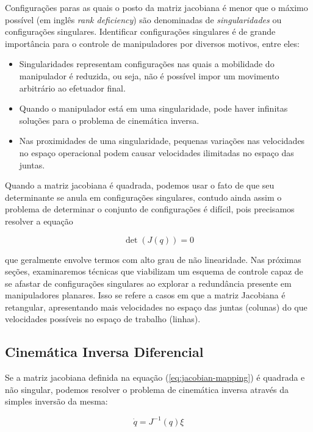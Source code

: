 Configurações paras as quais o posto da matriz jacobiana é menor que o máximo
possível (em inglês \emph{rank deficiency}) são denominadas de
\emph{singularidades} ou configurações singulares. Identificar configurações
singulares é de grande importância para o controle de manipuladores por
diversos motivos, entre eles:

\begin{itemize}
    \item Singularidades representam configurações nas quais a mobilidade do manipulador
          é reduzida, ou seja, não é possível impor um movimento arbitrário ao efetuador
          final.
    \item Quando o manipulador está em uma singularidade, pode haver infinitas soluções
          para o problema de cinemática inversa.
    \item Nas proximidades de uma singularidade, pequenas variações nas velocidades no
          espaço operacional podem causar velocidades ilimitadas no espaço das juntas.
\end{itemize}

Quando a matriz jacobiana é quadrada, podemos usar o fato de que seu
determinante se anula em configurações singulares, contudo ainda assim o
problema de determinar o conjunto de configurações é difícil, pois precisamos
resolver a equação

\begin{equation}
    \det(J(q)) = 0
\end{equation}

que geralmente envolve termos com alto grau de não linearidade. Nas próximas
seções, examinaremos técnicas que viabilizam um esquema de controle capaz de se
afastar de configurações singulares ao explorar a redundância presente em
manipuladores planares. Isso se refere a casos em que a matriz Jacobiana é
retangular, apresentando mais velocidades no espaço das juntas (colunas) do que
velocidades possíveis no espaço de trabalho (linhas).

\subsection{Cinemática Inversa Diferencial}

Se a matriz jacobiana definida na equação (\ref{eq:jacobian-mapping}) é
quadrada e não singular, podemos resolver o problema de cinemática inversa
através da simples inversão da mesma:

\begin{equation}\label{eq:resolved-rate}
    \dot{q} = J^{-1}(q) \xi
\end{equation}

